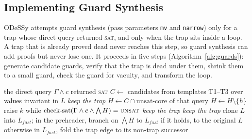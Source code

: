 \documentclass[acmsmall,screen,nonacm]{acmart}
\newcommand{\odessy}{ODeSSy}
\newcommand{\tool}{\odessy}
\begin{document}
\subsection{Implementing Guard Synthesis}
\label{sec:guards-impl}
\tool{} attempts guard synthesis (pass parameters \texttt{mv} and
\texttt{narrow}) only for a trap whose direct query returned
\textsc{sat}, and only when the trap sits inside a
loop. A trap that is already proved dead never reaches this step, so
guard synthesis can add proofs but never lose one. It proceeds in five
steps (Algorithm~\ref{alg:guards}): generate candidate guards, verify
that the trap is dead under them, shrink them to a small guard, check
the guard for vacuity, and transform the loop.

\begin{algorithm}[t]
\caption{Guard synthesis for one trap edge $(P, c)$ inside loop $L$}
\label{alg:guards}
\small
\begin{algorithmic}[1]
\Require the direct query $\Gamma \wedge c$ returned \textsc{sat}
\State $C \gets$ candidates from templates T1--T3 over values
  invariant in $L$ 
 
  \State \Return \textit{keep the trap}
\EndIf
\State $H \gets C \cap \mathrm{unsat\mbox{-}core}$ of that query 
    \State $H \gets H \setminus \{h\}$
  \EndIf
\EndFor
{} 
  \State raise $k$ while $\mathrm{check\mbox{-}sat}(\Gamma \wedge c \wedge \bigwedge H) = \textsc{unsat}$
\EndFor
{} 
  \State \Return \textit{keep the trap}
\EndIf
{}
  \State \Return \textit{keep the trap}
\EndIf
\State clone $L$ into $L_{\mathit{fast}}$; in the preheader, branch on
  $\bigwedge H$ 
\Statex \hspace{\algorithmicindent} to $L_{\mathit{fast}}$ if it holds,
  to the original $L$ otherwise
\State in $L_{\mathit{fast}}$, fold the trap edge to its non-trap
  successor
\end{algorithmic}
\end{algorithm}
\end{document}
